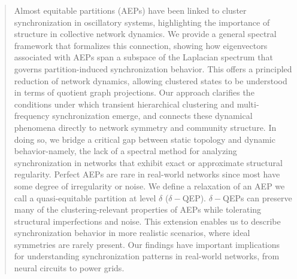 \documentclass[%
 aip,
 amsmath,amssymb,
preprint,
reprint, onecolumn %
]{revtex4-1}
\begin{document}
\begin{abstract}
Almost equitable partitions (AEPs) have been linked to cluster synchronization in oscillatory systems, highlighting the importance of structure in collective network dynamics. 
We provide a general spectral framework that formalizes this connection, showing how eigenvectors associated with AEPs span a subspace of the Laplacian spectrum that governs partition-induced synchronization behavior. This offers a principled reduction of network dynamics, allowing clustered states to be understood in terms of quotient graph projections. 
Our approach clarifies the conditions under which transient hierarchical clustering and multi-frequency synchronization emerge, and connects these dynamical phenomena directly to network symmetry and community structure. 
In doing so, we bridge a critical gap between static topology and dynamic behavior-namely, the lack of a spectral method for analyzing synchronization in networks that exhibit exact or approximate structural regularity.
Perfect AEPs are rare in real-world networks since most have some degree of irregularity or noise. We define a relaxation of an AEP we call a quasi-equitable partition at level $\delta$ ($\delta-$QEP). $\delta-$QEPs can preserve many of the clustering-relevant properties of AEPs while tolerating structural imperfections and noise. This extension enables us to describe synchronization behavior in more realistic scenarios, where ideal symmetries are rarely present.
Our findings have important implications for understanding synchronization patterns in real-world networks, from neural circuits to power grids.
\end{abstract}



\maketitle

\end{document}
